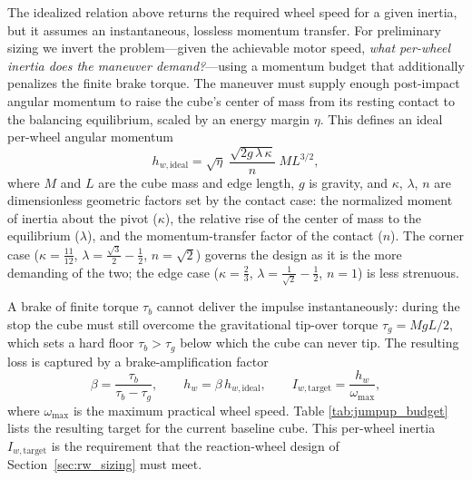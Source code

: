 The idealized relation above returns the required wheel speed for a given
inertia, but it assumes an instantaneous, lossless momentum transfer. For
preliminary sizing we invert the problem---given the achievable motor speed,
\emph{what per-wheel inertia does the maneuver demand?}---using a momentum
budget that additionally penalizes the finite brake torque. The maneuver must
supply enough post-impact angular momentum to raise the cube's center of mass
from its resting contact to the balancing equilibrium, scaled by an energy
margin $\eta$. This defines an ideal per-wheel angular momentum
\begin{equation}
h_{w,\text{ideal}} = \sqrt{\eta}\;\frac{\sqrt{2 g\,\lambda\,\kappa}}{n}\;M L^{3/2},
\label{eq:hw_ideal}
\end{equation}
where $M$ and $L$ are the cube mass and edge length, $g$ is gravity, and
$\kappa$, $\lambda$, $n$ are dimensionless geometric factors set by the contact
case: the normalized moment of inertia about the pivot ($\kappa$), the relative
rise of the center of mass to the equilibrium ($\lambda$), and the
momentum-transfer factor of the contact ($n$). The corner case
($\kappa=\tfrac{11}{12}$, $\lambda=\tfrac{\sqrt3}{2}-\tfrac12$, $n=\sqrt2$)
governs the design as it is the more demanding of the two; the edge case
($\kappa=\tfrac{2}{3}$, $\lambda=\tfrac{1}{\sqrt2}-\tfrac12$, $n=1$) is less
strenuous.

A brake of finite torque $\tau_b$ cannot deliver the impulse instantaneously:
during the stop the cube must still overcome the gravitational tip-over torque
$\tau_g = MgL/2$, which sets a hard floor $\tau_b > \tau_g$ below which the cube
can never tip. The resulting loss is captured by a brake-amplification factor
\begin{equation}
\beta = \frac{\tau_b}{\tau_b - \tau_g},
\qquad
h_w = \beta\,h_{w,\text{ideal}},
\qquad
I_{w,\text{target}} = \frac{h_w}{\omega_{\max}},
\label{eq:Iw_target}
\end{equation}
where $\omega_{\max}$ is the maximum practical wheel speed. Table
\ref{tab:jumpup_budget} lists the resulting target for the current baseline
cube. This per-wheel inertia $I_{w,\text{target}}$ is the requirement that the
reaction-wheel design of Section~\ref{sec:rw_sizing} must meet.

